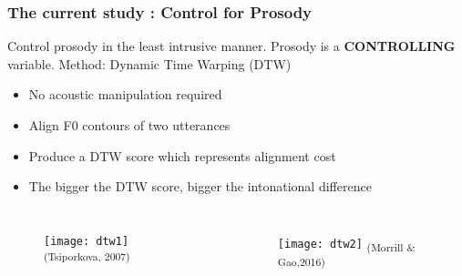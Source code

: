 \documentclass{beamer}
\begin{document}
\begin{frame}
\frametitle{The current study : Control for Prosody}
Control prosody in the least intrusive manner.  Prosody is a {\bf CONTROLLING} variable.  
\linebreak
\linebreak
Method: Dynamic Time Warping (DTW) 
\begin{itemize}
\item No acoustic manipulation required
\item Align F0 contours of two utterances
\item Produce a DTW score which represents alignment cost
\item The bigger the DTW score, bigger the intonational difference
\end{itemize}
\begin{columns}[c] %
\begin{figure}
\texttt{[image: dtw1]}
\linebreak \textsubscript{(Tsiporkova, 2007) }
\end{figure}
\begin{figure}
\texttt{[image: dtw2]}
\linebreak\textsubscript{(Morrill \& Gao,2016)}
\end{figure}
\end{columns}
\end{frame}

\end{document}
